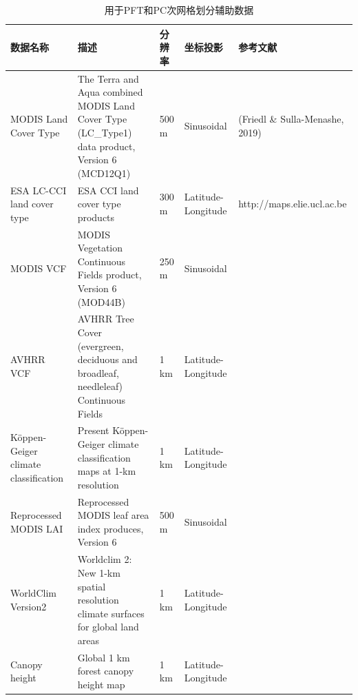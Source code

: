 \begin{table}
\centering
\caption{用于PFT和PC次网格划分辅助数据}
\label{tab:网格划分辅助数据}

\begin{tabular}[h]{p{3cm}p{6cm}p{2cm}p{2cm}p{5cm}}
\toprule
数据名称                                                            & 描述                                                                                              & 分辨率   & 坐标投影               & 参考文献                                            \\ \midrule
MODIS Land Cover Type & The Terra and Aqua combined MODIS Land Cover Type (LC\_Type1) data product, Version 6 (MCD12Q1) & 500 m & Sinusoidal        & (Friedl \& Sulla-Menashe, 2019)                \\\midrule
ESA LC-CCI land cover type                                      & ESA CCI land cover type products                                                                & 300 m & Latitude-Longitude & http://maps.elie.ucl.ac.be \\\midrule
MODIS VCF                                                       & MODIS Vegetation Continuous Fields product, Version 6 (MOD44B)                                           & 250 m & Sinusoidal         & \citet{DiMiceli2015}                        \\\midrule
AVHRR VCF                                                      & AVHRR Tree Cover (evergreen, deciduous and broadleaf, needleleaf) Continuous Fields                      & 1 km  & Latitude-Longitude & \citet{defries2000new}                         \\\midrule
Köppen-Geiger climate classification                                     & Present Köppen-Geiger climate classification maps at 1-km resolution                            & 1 km  & Latitude-Longitude & \citet{beck2018}                            \\\midrule
Reprocessed MODIS LAI                                           & Reprocessed MODIS leaf area index produces, Version 6                                           & 500 m & Sinusoidal         & \citet{yuan2011reprocessing}                              \\\midrule
WorldClim Version2                                             & Worldclim 2: New 1-km spatial resolution climate surfaces for global land areas                          & 1 km  & Latitude-Longitude & \citet{fick2017worldclim}                        \\\midrule
Canopy height                                                   & Global 1 km forest canopy height map                                                            & 1 km  & Latitude-Longitude & \citet{simard2011mapping}                          \\ \bottomrule
\end{tabular}
\end{table}
